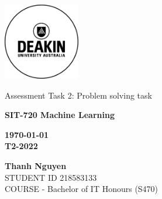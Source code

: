\thispagestyle{empty}
\begin{titlepage}
    \includegraphics[width=0.25\textwidth]{Appendices/Deakin_Logo.jpeg}
    \begin{center}
        \vspace*{4cm}
        {\LARGE Assessment Task 2: Problem solving task}
        \vspace{3cm}
        \begin{large}


            \bf SIT-720 Machine Learning
            \vspace{1cm}

            \bf \today \\
            T2-2022

            \vspace{3cm}
            \textbf{Thanh Nguyen}\\
            STUDENT ID 218583133 \\
            COURSE - Bachelor of IT Honours (S470)
            \vfill

        \end{large}
    \end{center}
\end{titlepage}
